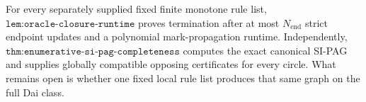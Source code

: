 For every separately supplied fixed finite monotone rule list, \(\texttt{lem:oracle-closure-runtime}\) proves termination after at most \(N_{\mathrm{end}}\) strict endpoint updates and a polynomial mark-propagation runtime.  Independently, \(\texttt{thm:enumerative-si-pag-completeness}\) computes the exact canonical SI-PAG and supplies globally compatible opposing certificates for every circle.  What remains open is whether one fixed local rule list produces that same graph on the full Dai class.